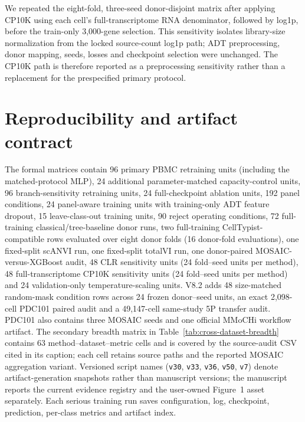\documentclass[10pt]{article}
\begin{document}
We repeated the eight-fold, three-seed donor-disjoint matrix after applying CP10K using each cell's full-transcriptome RNA denominator, followed by log1p, before the train-only 3,000-gene selection. This sensitivity isolates library-size normalization from the locked source-count log1p path; ADT preprocessing, donor mapping, seeds, losses and checkpoint selection were unchanged. The CP10K path is therefore reported as a preprocessing sensitivity rather than a replacement for the prespecified primary protocol.

\begin{table}[H]
\centering
\caption{Full-transcriptome RNA library-size normalization sensitivity. Values are donor means with two-sided 95\% Student-$t$ intervals after averaging three seeds within each held-out donor. The CP10K denominator uses all 20,729 stored RNA features before train-only gene selection; no validation or test labels selected the transform.}
\label{tab:rna-cp10k-sensitivity}
\scriptsize
\setlength{\tabcolsep}{2.4pt}
\resizebox{\textwidth}{!}{%

}
\end{table}

\section{Reproducibility and artifact contract}

The formal matrices contain 96 primary PBMC retraining units (including the matched-protocol MLP), 24 additional parameter-matched capacity-control units, 96 branch-sensitivity retraining units, 24 full-checkpoint ablation units, 192 panel conditions, 24 panel-aware training units with training-only ADT feature dropout, 15 leave-class-out training units, 90 reject operating conditions, 72 full-training classical/tree-baseline donor runs, two full-training CellTypist-compatible rows evaluated over eight donor folds (16 donor-fold evaluations), one fixed-split scANVI run, one fixed-split totalVI run, one donor-paired MOSAIC-versus-XGBoost audit, 48 CLR sensitivity units (24 fold--seed units per method), 48 full-transcriptome CP10K sensitivity units (24 fold--seed units per method) and 24 validation-only temperature-scaling units. V8.2 adds 48 size-matched random-mask condition rows across 24 frozen donor--seed units, an exact 2,098-cell PDC101 paired audit and a 49,147-cell same-study 5P transfer audit. PDC101 also contains three MOSAIC seeds and one official MMoCHi workflow artifact. The secondary breadth matrix in Table~\ref{tab:cross-dataset-breadth} contains 63 method--dataset--metric cells and is covered by the source-audit CSV cited in its caption; each cell retains source paths and the reported MOSAIC aggregation variant. Versioned script names (\texttt{v30}, \texttt{v33}, \texttt{v36}, \texttt{v50}, \texttt{v7}) denote artifact-generation snapshots rather than manuscript versions; the manuscript reports the current evidence registry and the user-owned Figure~1 asset separately. Each serious training run saves configuration, log, checkpoint, prediction, per-class metrics and artifact index.
\end{document}
